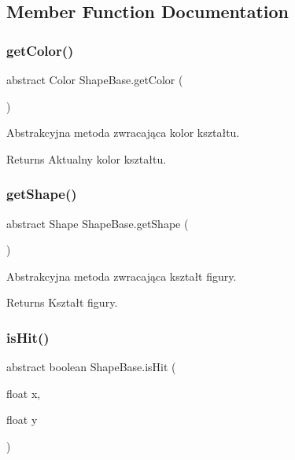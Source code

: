 \subsection{Member Function Documentation}
\mbox{\label{class_shape_base_aa2273c89bbd03d978c7a750293180fcb}} 
\subsubsection{get\+Color()}
{\footnotesize\ttfamily abstract Color Shape\+Base.\+get\+Color (\begin{DoxyParamCaption}{ }\end{DoxyParamCaption})\hspace{0.3cm}{\ttfamily [abstract]}}

Abstrakcyjna metoda zwracająca kolor kształtu. \begin{DoxyReturn}{Returns}
Aktualny kolor kształtu. 
\end{DoxyReturn}
\mbox{\label{class_shape_base_a0862131e56fc22f4315c01104f04b7c2}} 
\subsubsection{get\+Shape()}
{\footnotesize\ttfamily abstract Shape Shape\+Base.\+get\+Shape (\begin{DoxyParamCaption}{ }\end{DoxyParamCaption})\hspace{0.3cm}{\ttfamily [abstract]}}

Abstrakcyjna metoda zwracająca kształt figury. \begin{DoxyReturn}{Returns}
Kształt figury. 
\end{DoxyReturn}
\mbox{\label{class_shape_base_ac97cceedf62e85921e13a923599122dc}} 
\subsubsection{is\+Hit()}
{\footnotesize\ttfamily abstract boolean Shape\+Base.\+is\+Hit (\begin{DoxyParamCaption}\item[{float}]{x,  }\item[{float}]{y }\end{DoxyParamCaption})\hspace{0.3cm}{\ttfamily [abstract]}}

